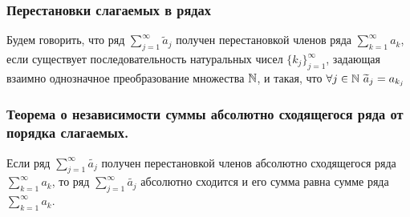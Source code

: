 \documentclass[12pt, a4paper]{article}
\begin{document}
    \subsubsection{Перестановки слагаемых в рядах}
    Будем говорить, что ряд $\sum_{j=1}^{\infty} \widetilde{a}_{j}$ получен перестановкой членов ряда $\sum_{k=1}^{\infty} a_k$, если существует последовательность натуральных чисел $\{k_j\}^{\infty}_{j=1}$, задающая взаимно однозначное преобразование множества $\mathbb{N}$, и такая, что $\forall j \in \mathbb{N} \ \widetilde{a}_j = a_{k_j}$
    \subsubsection{Теорема о независимости суммы абсолютно сходящегося ряда от порядка слагаемых.}
    Если ряд $\sum_{j=1}^{\infty} \widetilde{a_j}$ получен перестановкой членов абсолютно сходящегося ряда $\sum_{k=1}^{\infty} a_k$, то ряд $\sum_{j=1}^{\infty} \widetilde{a_j}$ абсолютно сходится и его сумма равна сумме ряда $\sum_{k=1}^{\infty} a_k$.
\end{document}

